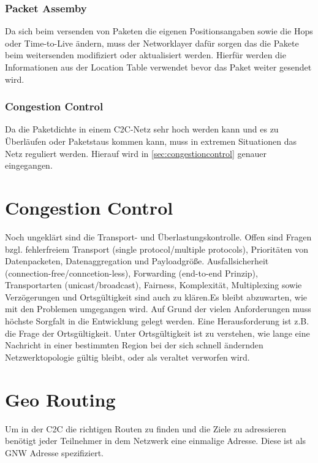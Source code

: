 \subsubsection{Packet Assemby}
Da sich beim versenden von Paketen die eigenen Positionsangaben sowie die Hops oder Time-to-Live ändern, muss der Networklayer dafür sorgen das die Pakete beim weitersenden modifiziert oder aktualisiert werden. Hierfür werden die Informationen aus der Location Table verwendet bevor das Paket weiter gesendet wird.

\subsubsection{Congestion Control}
Da die Paketdichte in einem C2C-Netz sehr hoch werden kann und es zu Überläufen oder Paketstaus kommen kann, muss in extremen Situationen das Netz reguliert werden. Hierauf wird in \autoref{sec:congestioncontrol} genauer eingegangen.

\section{Congestion Control\label{sec:congestioncontrol}}
Noch ungeklärt sind die Transport- und Überlastungskontrolle. Offen sind Fragen bzgl. fehlerfreiem Transport (single protocol/multiple protocols), Prioritäten von Datenpacketen, Datenaggregation und Payloadgröße. Ausfallsicherheit (connection-free/conncetion-less), Forwarding (end-to-end Prinzip), Transportarten (unicast/broadcast), Fairness, Komplexität, Multiplexing sowie Verzögerungen und Ortsgültigkeit sind auch zu klären.Es bleibt abzuwarten, wie mit den Problemen umgegangen wird. Auf Grund der vielen Anforderungen muss höchste Sorgfalt in die Entwicklung gelegt werden. Eine Herausforderung ist z.B. die Frage der Ortsgültigkeit. Unter Ortsgültigkeit ist zu verstehen, wie lange eine Nachricht in einer bestimmten Region bei der sich schnell ändernden Netzwerktopologie gültig bleibt, oder als veraltet verworfen wird.

\section{Geo Routing\label{sec:georouting}}
Um in der \acl{C2C} die richtigen Routen zu finden und die Ziele zu adressieren benötigt jeder Teilnehmer in dem Netzwerk eine einmalige Adresse. Diese ist als \acl{GNW} Adresse spezifiziert. 

